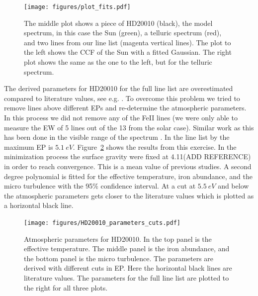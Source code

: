 \documentclass{aa}
\begin{document}
\begin{figure}[htbp!]
    \centering
    \texttt{[image: figures/plot\_fits.pdf]}
    \caption{The middle plot shows a piece of HD20010 (black), the model
    spectrum, in this case the Sun (green), a telluric spectrum (red), and two
    lines from our line list (magenta vertical lines). The plot to the left
    shows the CCF of the Sun with a fitted Gaussian. The right plot shows the
    same as the one to the left, but for the telluric spectrum.}
    \label{fig:plot_fits}
\end{figure}

The derived parameters for HD20010 for the full line list
are overestimated compared to literature values, see e.g.
\citet{Mortier2013,Lebzelter2012}. To overcome this problem we
tried to remove lines above different EPs and re-determine the
atmospheric parameters. In this process we did not remove any of
the FeII lines (we were only able to measure the EW of 5 lines out
of the 13 from the solar case). Similar work as this has been done
in the visible range of the spectrum \citep{Tsantaki2013}. In the
line list by \citep{Tsantaki2013} the maximum EP is $\SI{5.1}{eV}$.
Figure~\ref{fig:HD20010_parameters_cuts} shows the results from this
exercise. In the minimization process the surface gravity were fixed
at 4.11(ADD REFERENCE) in order to reach convergence. This is a mean
value of previous studies. A second degree polynomial is fitted for the
effective temperature, iron abundance, and the micro turbulence with
the 95\% confidence interval. At a cut at $\SI{5.5}{eV}$ and below the
atmospheric parameters gets closer to the literature values which is
plotted as a horizontal black line.


\begin{figure}[htpb!]
    \centering
    \texttt{[image: figures/HD20010\_parameters\_cuts.pdf]}
    \caption{Atmospheric parameters for HD20010. In the top panel is the
    effective temperature. The middle panel is the iron abundance, and the
    bottom panel is the micro turbulence. The parameters are derived with
    different cuts in EP. Here the horizontal black lines are literature values.
    The parameters for the full line list are plotted to the right for all
    three plots.}
    \label{fig:HD20010_parameters_cuts}
\end{figure}











\newpage


\nocite*{}
\end{document}
